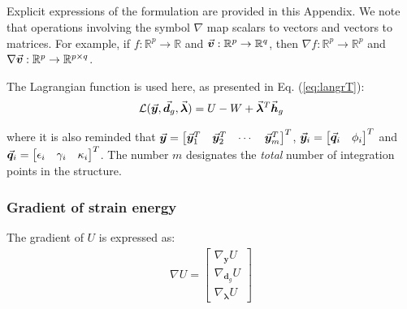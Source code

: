 \begin{appendices}



\chapter{}\label{appendix:A}

Explicit expressions of the formulation are provided in this
Appendix. We note that operations involving the symbol $\nabla$ map scalars to
vectors and vectors to matrices. For example, if $f:\mathbb{R}^p\rightarrow 
\mathbb{R}$ and
$\vec{\boldsymbol{v}}:\mathbb{R}^p\rightarrow\mathbb{R}^q$, then $\nabla
f:\mathbb{R}^p\rightarrow\mathbb{R}^p$ and
$\nabla\vec{\boldsymbol{v}}:\mathbb{R}^p\rightarrow\mathbb{R}^{p\times q}$.

The Lagrangian function is used here, as presented in Eq.
(\ref{eq:langrT}):
\begin{gather}
	\mathcal{L}(\vec{\boldsymbol{y}}, \vec{\boldsymbol{d}}_g,\vec{\boldsymbol{\lambda}}) =
	U-W+\vec{\boldsymbol{\lambda}}^T\vec{\boldsymbol{h}}_g
	\label{eq:globalL}
\end{gather}

\noindent where it is also reminded that $\vec{\boldsymbol{y}} = \begin{bmatrix}
	\vec{\boldsymbol{y}}_1^T & \vec{\boldsymbol{y}}_2^T & \cdots & \vec{\boldsymbol{y}}_m^T
\end{bmatrix}^T$, $\vec{\boldsymbol{y}}_i = \begin{bmatrix}
	\vec{\boldsymbol{q}}_i & \phi_i
\end{bmatrix}^T$ and $\vec{\boldsymbol{q}}_i = \begin{bmatrix}
	\epsilon_i & \gamma_i & \kappa_i
\end{bmatrix}^T$. The number $m$ designates the \emph{total} number of
integration points in the structure.

\subsection{Gradient of strain energy}
The gradient of $U$ is expressed as:
\begin{gather}
	\nabla U = \begin{bmatrix}
		\nabla_{\mathbf{y}}U\\ \nabla_{\mathbf{d}_g}U\\ 
		\nabla_{\mathbf{\lambda}}U
	\end{bmatrix}\nonumber
\end{gather}


\end{appendices}
